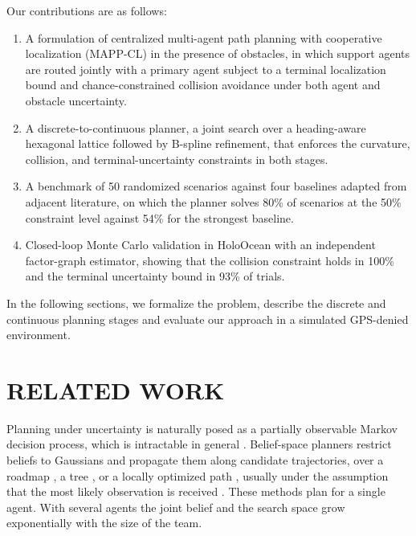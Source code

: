 \documentclass[letterpaper, 10 pt, conference]{ieeeconf}
\theoremstyle{remark}
\begin{document}
Our contributions are as follows:
\begin{enumerate}
  \item A formulation of centralized multi-agent path planning with cooperative
    localization (MAPP-CL) in the presence of obstacles, in which support
    agents are routed jointly with a primary agent subject to a terminal
    localization bound and chance-constrained collision avoidance under both
    agent and obstacle uncertainty.
  \item A discrete-to-continuous planner, a joint search over a heading-aware
    hexagonal lattice followed by B-spline refinement, that enforces the
    curvature, collision, and terminal-uncertainty constraints in both stages.
  \item A benchmark of 50 randomized scenarios against four baselines adapted
    from adjacent literature, on which the planner solves 80\% of scenarios at
    the 50\% constraint level against 54\% for the strongest baseline.
  \item Closed-loop Monte Carlo validation in HoloOcean with an independent
    factor-graph estimator, showing that the collision constraint holds in 100\% and the terminal
    uncertainty bound in 93\% of trials.
\end{enumerate}

In the following sections, we formalize the problem, describe the discrete and continuous planning stages and evaluate our approach in a simulated GPS-denied environment.


\section{RELATED WORK}
\label{sec:related}
Planning under uncertainty is naturally posed as a partially observable Markov
decision process, which is intractable in general \cite{kaelbling1998pomdp}.
Belief-space planners restrict beliefs to Gaussians and propagate them along
candidate trajectories, over a roadmap \cite{prentice2009brm}, a tree
\cite{bry2011rrbt}, or a locally optimized path \cite{vandenberg2011lqgmp},
usually under the assumption that the most likely observation is received
\cite{platt2010belief}. These methods plan for a single agent. With several
agents the joint belief and the search space grow exponentially with the
size of the team.
\end{document}
